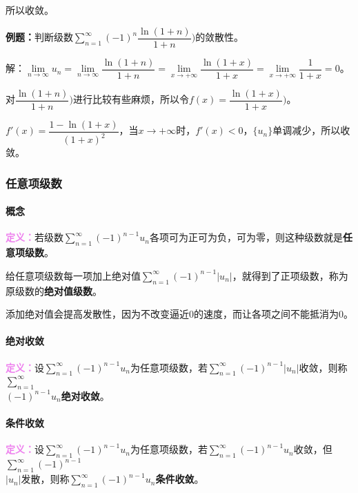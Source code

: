 所以收敛。

\textbf{例题：}判断级数$\sum\limits_{n=1}^\infty(-1)^n\dfrac{\ln(1+n)}{1+n})$的敛散性。

解：$\lim\limits_{n\to\infty}u_n=\lim\limits_{n\to\infty}\dfrac{\ln(1+n)}{1+n}=\lim\limits_{x\to+\infty}\dfrac{\ln(1+x)}{1+x}=\lim\limits_{x\to+\infty}\dfrac{1}{1+x}=0$。

对$\dfrac{\ln(1+n)}{1+n})$进行比较有些麻烦，所以令$f(x)=\dfrac{\ln(1+x)}{1+x})$。

$f'(x)=\dfrac{1-\ln(1+x)}{(1+x)^2}$，当$x\to+\infty$时，$f'(x)<0$，$\{u_n\}$单调减少，所以收敛。

\subsubsection{任意项级数}

\paragraph{概念} \leavevmode \medskip

\textcolor{violet}{\textbf{定义：}}若级数$\sum\limits_{n=1}^\infty(-1)^{n-1}u_n$各项可为正可为负，可为零，则这种级数就是\textbf{任意项级数}。

给任意项级数每一项加上绝对值$\sum\limits_{n=1}^\infty(-1)^{n-1}\vert u_n\vert$，就得到了正项级数，称为原级数的\textbf{绝对值级数}。

添加绝对值会提高发散性，因为不改变逼近0的速度，而让各项之间不能抵消为0。

\paragraph{绝对收敛} \leavevmode \medskip

\textcolor{violet}{\textbf{定义：}}设$\sum\limits_{n=1}^\infty(-1)^{n-1}u_n$为任意项级数，若$\sum\limits_{n=1}^\infty(-1)^{n-1}\vert u_n\vert$收敛，则称$\sum\limits_{n=1}^\infty$\\$(-1)^{n-1}u_n$\textbf{绝对收敛}。

\paragraph{条件收敛} \leavevmode \medskip

\textcolor{violet}{\textbf{定义：}}设$\sum\limits_{n=1}^\infty(-1)^{n-1}u_n$为任意项级数，若$\sum\limits_{n=1}^\infty(-1)^{n-1}u_n$收敛，但$\sum\limits_{n=1}^\infty(-1)^{n-1}$\\$\vert u_n\vert$发散，则称$\sum\limits_{n=1}^\infty(-1)^{n-1}u_n$\textbf{条件收敛}。

